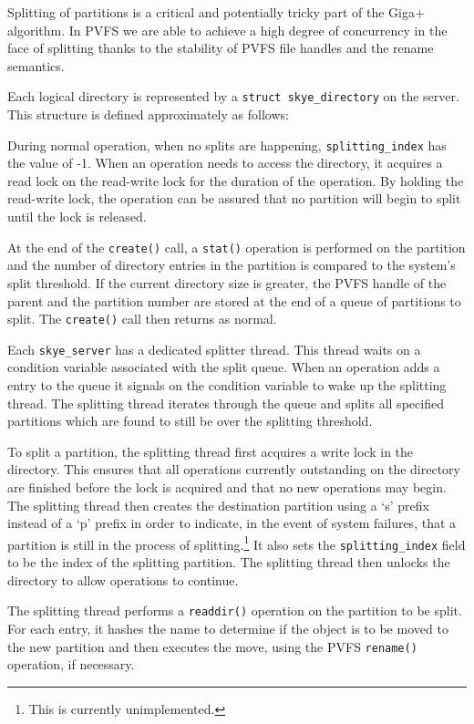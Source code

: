 \documentclass[twocolumn,letterpaper]{article}
\newcommand{\code}[1]{\texttt{#1}}
\begin{document}
Splitting of partitions is a critical and potentially tricky part of the Giga+
algorithm.  In PVFS we are able to achieve a high degree of concurrency in the
face of splitting thanks to the stability of PVFS file handles and the rename
semantics.

Each logical directory is represented by a \code{struct skye\_\-directory} on
the server.  This structure is defined approximately as follows:


During normal operation, when no splits are happening,
\code{splitting\_\-index} has the value of -1.  When an operation needs to
access the directory, it acquires a read lock on the read-write lock for the
duration of the operation.  By holding the read-write lock, the operation can
be assured that no partition will begin to split until the lock is released.

At the end of the \code{create()} call, a \code{stat()} operation is performed
on the partition and the number of directory entries in the partition is
compared to the system's split threshold.  If the current directory size is
greater, the PVFS handle of the parent and the partition number are stored at
the end of a queue of partitions to split.  The \code{create()} call then
returns as normal.

Each \code{skye\_\-server} has a dedicated splitter thread.  This thread waits on a
condition variable associated with the split queue.  When an operation adds a
entry to the queue it signals on the condition variable to wake up the splitting
thread.  The splitting thread iterates through the queue and splits all
specified partitions which are found to still be over the splitting threshold.

To split a partition, the splitting thread first acquires a write lock in the
directory.  This ensures that all operations currently outstanding on the
directory are finished before the lock is acquired and that no new operations
may begin.  The splitting thread then creates the destination partition using a
`s' prefix instead of a `p' prefix in order to indicate, in the event of system
failures, that a partition is still in the process of splitting.\footnote{This
is currently unimplemented.}  It also sets the \code{splitting\_\-index} field
to be the index of the splitting partition.  The splitting thread then unlocks
the directory to allow operations to continue.

The splitting thread performs a \code{readdir()} operation on the partition to be
split.  For each entry, it hashes the name to determine if the object is to be
moved to the new partition and then executes the move, using the PVFS
\code{rename()} operation, if necessary.
\end{document}
